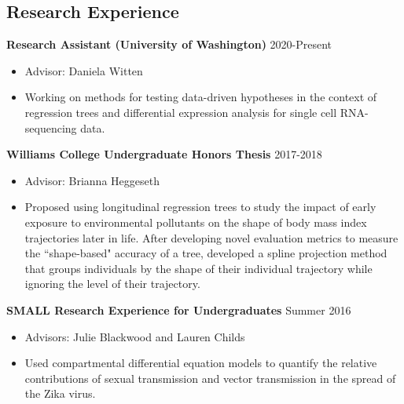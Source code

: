 \documentclass[margin, 10pt]{res} %
\begin{document}
\begin{resume}
 
\section{Research Experience}

{\textbf{Research Assistant (University of Washington)} \hfill 2020-Present
\begin{itemize}
\item Advisor: Daniela Witten
\item Working on methods for testing data-driven hypotheses in the context of regression trees and differential expression analysis for single cell RNA-sequencing data.
\end{itemize} 

{\textbf{Williams College Undergraduate Honors Thesis}} \hfill 2017-2018 
\begin{itemize}
\item Advisor: Brianna Heggeseth
\item Proposed using longitudinal regression trees to study the impact of early exposure to environmental pollutants on the shape of body mass index trajectories later in life. After developing novel evaluation metrics to measure the ``shape-based" accuracy of a tree, developed a spline projection method that groups individuals by the shape of their individual trajectory while ignoring the level of their trajectory. 
\end{itemize} 

{\textbf{SMALL Research Experience for Undergraduates}} \hfill Summer 2016 
\begin{itemize}
\item Advisors: Julie Blackwood and Lauren Childs
\item Used compartmental differential equation models to quantify the relative contributions of sexual transmission and vector transmission in the spread of the Zika virus. 
\end{itemize} 


}
\end{resume}
\end{document}
